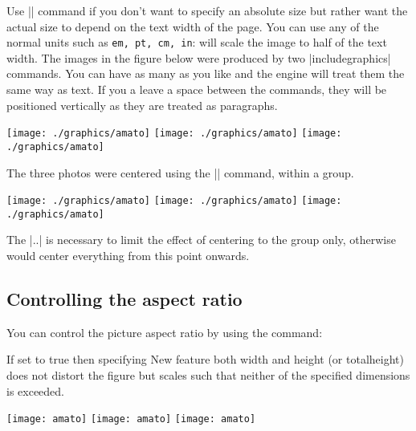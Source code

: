 Use |\textwidth| command if you don't want to specify an absolute size but rather want the actual size to depend on the text width of the page. You can use any of the normal \tex units such as \texttt{em, pt, cm, in}:
\noindent will scale the image to half of the text width. The images in the
figure below were produced by two |includegraphics| commands. You can have as many as you like and the \tex engine will treat them the same way as text. If you a leave a space between the commands, they will be positioned vertically as they are treated as paragraphs.

\medskip
\begingroup

\centering
\texttt{[image: ./graphics/amato]}
\texttt{[image: ./graphics/amato]}
\texttt{[image: ./graphics/amato]}

\endgroup


The three photos were centered using the |\centering| command, within a group.


\begin{teX}
\begingroup

\centering
\texttt{[image: ./graphics/amato]}
\texttt{[image: ./graphics/amato]}
\texttt{[image: ./graphics/amato]}
\endgroup
\end{teX}

The |\begingroup..\endgroup| is necessary to limit the effect of centering to
the group only, otherwise \tex would center everything from this point onwards.

\subsection{Controlling the aspect ratio}

You can control the picture aspect ratio by using the command:

\graybox{\texttt{\textbackslash includegraphics[keepaspectratio,width=3cm, height=3cm]]\{filename\}}}

If set to true then specifying New feature
both width and height (or totalheight) does not distort the ﬁgure but 
scales such that neither of the speciﬁed dimensions is exceeded.






\medskip
\begingroup

\centering
\texttt{[image: amato]}
\texttt{[image: amato]}
\texttt{[image: amato]}

